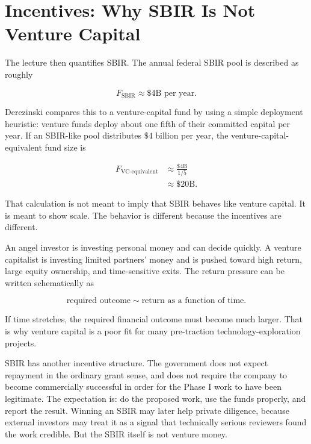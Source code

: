 \section{Incentives: Why SBIR Is Not Venture Capital}

The lecture then quantifies SBIR. The annual federal SBIR pool is described as roughly

\begin{equation}
F_{\text{SBIR}}\approx \$4\text{B per year}.
\end{equation}

Derezinski compares this to a venture-capital fund by using a simple deployment heuristic: venture funds deploy about one fifth of their committed capital per year. If an SBIR-like pool distributes \(\$4\) billion per year, the venture-capital-equivalent fund size is

\begin{align}
F_{\text{VC-equivalent}}
&\approx \frac{\$4\text{B}}{1/5}\\
&\approx \$20\text{B}.
\end{align}

That calculation is not meant to imply that SBIR behaves like venture capital. It is meant to show scale. The behavior is different because the incentives are different.

An angel investor is investing personal money and can decide quickly. A venture capitalist is investing limited partners' money and is pushed toward high return, large equity ownership, and time-sensitive exits. The return pressure can be written schematically as

\begin{equation}
\text{required outcome}
\sim
\text{return as a function of time}.
\end{equation}

If time stretches, the required financial outcome must become much larger. That is why venture capital is a poor fit for many pre-traction technology-exploration projects.

SBIR has another incentive structure. The government does not expect repayment in the ordinary grant sense, and does not require the company to become commercially successful in order for the Phase I work to have been legitimate. The expectation is: do the proposed work, use the funds properly, and report the result. Winning an SBIR may later help private diligence, because external investors may treat it as a signal that technically serious reviewers found the work credible. But the SBIR itself is not venture money.

